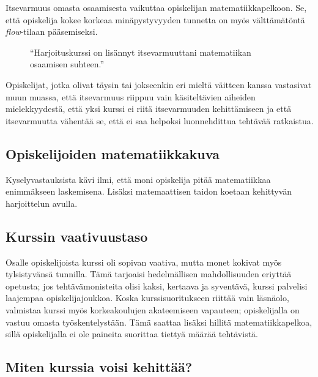 Itsevarmuus omasta osaamisesta vaikuttaa opiskelijan matematiikkapelkoon.
Se, että opiskelija kokee korkeaa minäpystyvyyden tunnetta on myös välttämätöntä \emph{flow}-tilaan pääsemiseksi.

\begin{figure}[h!]
\centering
{}
\caption{``Harjoituskurssi on lisännyt itsevarmuuttani matematiikan osaamisen suhteen.''}
\end{figure}

Opiskelijat, jotka olivat täysin tai jokseenkin eri mieltä väitteen kanssa vastasivat muun muassa, että itsevarmuus riippuu vain käsiteltävien aiheiden mielekkyydestä, että yksi kurssi ei riitä itsevarmuuden kehittämiseen ja että itsevarmuutta vähentää se, että ei saa helpoksi luonnehdittua tehtävää ratkaistua.


\subsection{Opiskelijoiden matematiikkakuva}
Kyselyvastauksista kävi ilmi, että moni opiskelija pitää matematiikkaa enimmäkseen laskemisena.
Lisäksi matemaattisen taidon koetaan kehittyvän harjoittelun avulla.


\subsection{Kurssin vaativuustaso}
Osalle opiskelijoista kurssi oli sopivan vaativa, mutta monet kokivat myös tylsistyvänsä tunnilla.
Tämä tarjoaisi hedelmällisen mahdollisuuden eriyttää opetusta; jos tehtävämonisteita olisi kaksi, kertaava ja syventävä, kurssi palvelisi laajempaa opiskelijajoukkoa.
Koska kurssisuoritukseen riittää vain läsnäolo, valmistaa kurssi myös korkeakoulujen akateemiseen vapauteen; opiskelijalla on vastuu omasta työskentelystään.
Tämä saattaa lisäksi hillitä matematiikkapelkoa, sillä opiskelijalla ei ole paineita suorittaa tiettyä määrää tehtävistä.

\subsection{Miten kurssia voisi kehittää?}



